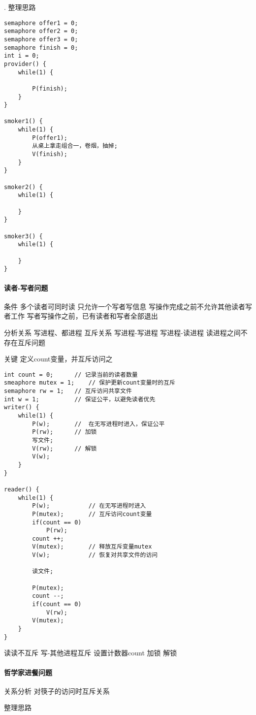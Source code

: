 . 整理思路 \\
\begin{lstlisting}
semaphore offer1 = 0;
semaphore offer2 = 0;
semaphore offer3 = 0;
semaphore finish = 0;
int i = 0;		
provider() {
	while(1) {
		
		P(finish);
	}
}

smoker1() {
	while(1) {
		P(offer1);
		从桌上拿走组合一，卷烟，抽掉;
		V(finish);
	}
}

smoker2() {
	while(1) {

	}	
}

smoker3() {
	while(1) {

	}
}

\end{lstlisting}

\paragraph{读者-写者问题}
条件
多个读者可同时读
只允许一个写者写信息
写操作完成之前不允许其他读者写者工作
写者写操作之前，已有读者和写者全部退出

分析关系
写进程、都进程
互斥关系
写进程-写进程
写进程-读进程
读进程之间不存在互斥问题

关键  
定义count变量，并互斥访问之

\begin{lstlisting}
int count = 0;		// 记录当前的读者数量
smeaphore mutex = 1;	// 保护更新count变量时的互斥
semaphore rw = 1;	// 互斥访问共享文件
int w = 1;			// 保证公平，以避免读者优先
writer() {
	while(1) {
		P(w);		//  在无写进程时进入，保证公平 
		P(rw);		// 加锁 
		写文件;
		V(rw);		// 解锁
		V(w);	
	}
}

reader() {
	while(1) {
		P(w);			// 在无写进程时进入 
		P(mutex);		// 互斥访问count变量 
		if(count == 0) 
			P(rw);
		count ++;		
		V(mutex);		// 释放互斥变量mutex
		V(w);			// 恢复对共享文件的访问 	
		
		读文件;
		
		P(mutex);		
		count --;
		if(count == 0)
			V(rw);
		V(mutex);
	}
}
\end{lstlisting}

读读不互斥
写-其他进程互斥
设置计数器count 加锁 解锁


\paragraph{哲学家进餐问题}
关系分析
对筷子的访问时互斥关系

整理思路


